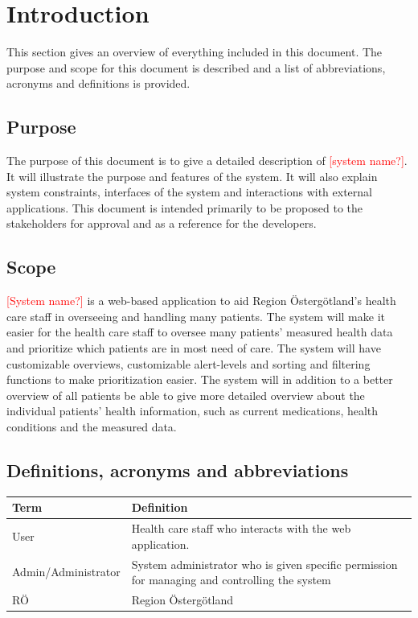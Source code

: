 \documentclass{scrreprt}
\begin{document}
\chapter{Introduction}
This section gives an overview of everything included in this document. The purpose and scope for this document is described and a list of abbreviations, acronyms and definitions is provided. 

\section{Purpose}
The purpose of this document is to give a detailed description of \textcolor{red}{[system name?]}. It will illustrate the purpose and features of the system. It will also explain system constraints, interfaces of the system and interactions with external applications. This document is intended primarily to be proposed to the stakeholders for approval and as a reference for the developers.

\section{Scope}
\textcolor{red}{[System name?]} is a web-based application to aid Region Östergötland's health care staff in overseeing and handling many patients. The system will make it easier for the health care staff to oversee many patients' measured health data and prioritize which patients are in most need of care. The system will have customizable overviews, customizable alert-levels and sorting and filtering functions to make prioritization easier. The system will in addition to a better overview of all patients be able to give more detailed overview about the individual patients' health information, such as current medications, health conditions and the measured data. 


\section{Definitions, acronyms and abbreviations}
\begin{center}
\begin{tabularx}{\linewidth}{| l | X |}
 \hline
 \textbf{Term} & \textbf{Definition} \\ 
 \hline
  User  & Health care staff who interacts with the web application.  \\
  \hline
  Admin/Administrator & System administrator who is given specific permission for managing and controlling the system  \\ 
  \hline
  RÖ  & Region Östergötland  \\ 
  \hline
\end{tabularx}
\end{center}
\end{document}
